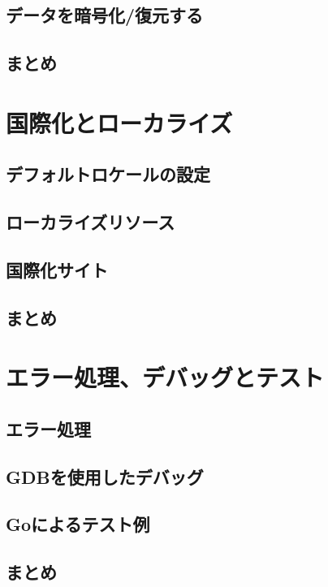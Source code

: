 \subsection{データを暗号化/復元する}

\subsection{まとめ}


\section{国際化とローカライズ}

\subsection{デフォルトロケールの設定}

\subsection{ローカライズリソース}

\subsection{国際化サイト}

\subsection{まとめ}


\section{エラー処理、デバッグとテスト}

\subsection{エラー処理}

\subsection{GDBを使用したデバッグ}

\subsection{Goによるテスト例}

\subsection{まとめ}


